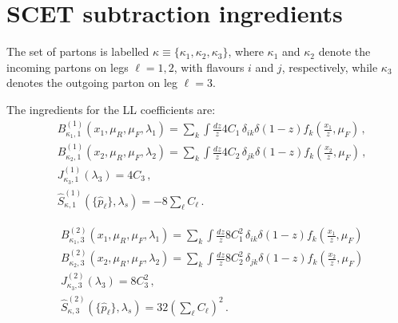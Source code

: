\section{SCET subtraction ingredients}
\label{ap:subtract-ingred}

The set of partons is labelled
$\kappa\equiv\{\kappa_1,\kappa_2,\kappa_3\}$, where $\kappa_1$ and
$\kappa_2$ denote the incoming partons on legs $\ell=1,2$, with flavours
$i$ and $j$, respectively, while $\kappa_3$ denotes the outgoing parton
on leg $\ell=3$.  

The ingredients for the LL coefficients are:
\begin{subequations}
\label{eq:C11-ingred}
\begin{align}
&B_{\kappa_{1},1}^{(1)}(x_1,\mu_R,\mu_F,\lambda_1) = \sum_{k}\int\frac{dz}{z} 4C_1\,\delta_{ik}\delta(1-z) f_k\left(\frac{x_1}{z},\mu_F\right)\,, \\[1ex]
&B_{\kappa_{2},1}^{(1)}(x_2,\mu_R,\mu_F,\lambda_2) = \sum_{k}\int\frac{dz}{z} 4C_2\,\delta_{jk}\delta(1-z)  f_k\left(\frac{x_2}{z},\mu_F\right)\,, \\[1ex]
&J_{\kappa_3,1}^{(1)}(\lambda_3) = 4C_3\,, \\[1ex]
&\widehat{S}_{\kappa,1}^{(1)} \left(\{\hat{p}_{\ell}\},\lambda_s\right)= -8\sum_{\ell}C_{\ell}\,.
\end{align}
\end{subequations}

\begin{subequations}
\label{eq:C23-ingred}
\begin{align}
&B_{\kappa_{1},3}^{(2)}(x_1,\mu_R,\mu_F,\lambda_1) = \sum_{k}\int\frac{dz}{z}
8C_1^2\,\delta_{ik}\delta(1-z) f_k\left(\frac{x_1}{z},\mu_F\right) \\[1ex]
&B_{\kappa_{2},3}^{(2)}(x_2,\mu_R,\mu_F,\lambda_2) = \sum_{k}\int\frac{dz}{z}
8C_2^2\,\delta_{jk}\delta(1-z) f_k\left(\frac{x_2}{z},\mu_F\right) \\[1ex]
&J_{\kappa_3,3}^{(2)}(\lambda_3) = 8C_3^2\,, \\[1ex]
&\widehat{S}_{\kappa,3}^{(2)}\left(\{\hat{p}_{\ell}\},\lambda_s\right) = 32\left(\sum_{\ell}C_{\ell}\right)^2\,.
\end{align}
\end{subequations}

